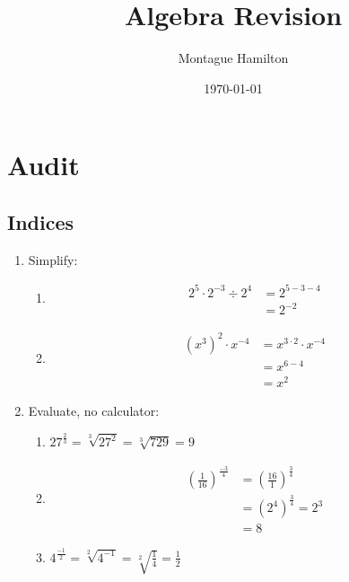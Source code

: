 \documentclass{article}
\begin{document}
\title{Algebra Revision}
\author{Montague Hamilton}
\date{\today}
\maketitle

\section{Audit}
\subsection{Indices}
\begin{enumerate}
  \item Simplify:
    \begin{enumerate}[label=\alph*)]
    \item \begin{align*}
        2^{5} \cdot 2^{-3} \div 2^{4} &= 2^{5-3-4} \\
                      &= 2^{-2}
      \end{align*}
    \item \begin{align*}
        (x^{3})^{2} \cdot x^{-4} &= x^{3 \cdot 2}\cdot x^{-4} \\
                    &= x^{6 - 4} \\
                    &= x^{2}
      \end{align*}
  \end{enumerate}
  \item Evaluate, no calculator:
    \begin{enumerate}[label=\alph*)]
      \item $27^{\frac{2}{3}} = \sqrt[3]{27^{2}} = \sqrt[3]{729} = 9$
      
      \item \begin{align*}
          \left(\frac{1}{16} \right)^{\frac{-3}{4}} &= \left(\frac{16}{1} \right)^{\frac{3}{4}} \\
          &= \left(2^{4} \right)^{\frac{3}{4}} = 2^{3} \\
          &= 8 %
        \end{align*}

    \item $4^{\frac{-1}{2}} = \sqrt[2]{4^{-1}} = \sqrt[2]{\frac{1}{4}} = \frac{1}{2}$
    \end{enumerate}


\end{enumerate}
\end{document}
